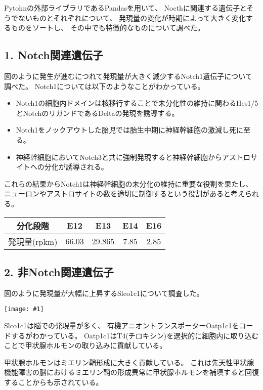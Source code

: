 \documentclass[a4paper,papersize,dvipdfmx]{jsarticle}
\newcommand{\pict}[2]{\begin{center} \texttt{[image: \#1]} \end{center}}   %
\begin{document}
Pytohnの外部ライブラリであるPandasを用いて、
Nocthに関連する遺伝子とそうでないものとそれぞれについて、
発現量の変化が時期によって大きく変化するものをソートし、
その中でも特徴的なものについて調べた。

\subsection*{1. Notch関連遺伝子}

図のように発生が進むにつれて発現量が大きく減少するNotch1遺伝子について調べた。
Notch1については以下のようなことがわかっている。

\begin{itemize}
\item Notch1の細胞内ドメインは核移行することで未分化性の維持に関わるHes1/5
とNotchのリガンドであるDeltaの発現を誘導する。

\item Notch1をノックアウトした胎児では胎生中期に神経幹細胞の激減し死に至る。

\item 神経幹細胞においてNotch3と共に強制発現すると神経幹細胞からアストロサイトへの分化が誘導される。
\end{itemize}
これらの結果からNotch1は神経幹細胞の未分化の維持に重要な役割を果たし、
ニューロンやアストロサイトの数を適切に制御するという役割があると考えられる。

\begin{table}[H]
  \centering
\begin{tabular}{|c|c|c|c|c|}
\hline
分化段階      & E12   & E13    & E14  & E16  \\ \hline
発現量(rpkm) & 66.03 & 29.865 & 7.85 & 2.85 \\ \hline
\end{tabular}
\end{table}


\subsection*{2. 非Notch関連遺伝子}
図のように発現量が大幅に上昇するSlco1c1について調査した。

\pict{images/npc.png}{10}

Slco1c1は脳での発現量が多く、
有機アニオントランスポーターOatp1c1をコードするがわかっている。
Oatp1c1はT4(チロキシン)を選択的に細胞内に取り込むことで甲状腺ホルモンの取り込みに貢献している。

甲状腺ホルモンはミエリン鞘形成に大きく貢献している。
これは先天性甲状腺機能障害の脳におけるミエリン鞘の形成異常に甲状腺ホルモンを補填すると回復することからも示されている。
\end{document}

